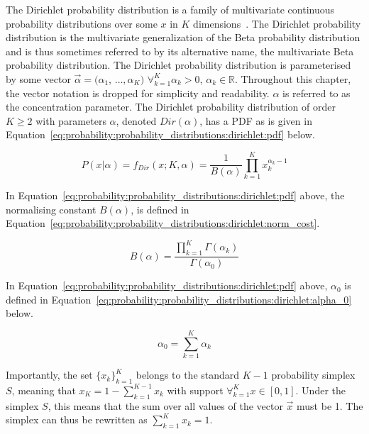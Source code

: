The Dirichlet probability distribution is a family of multivariate continuous probability distributions over some $x$ in $K$ dimensions~\cite{ref:wackerly:2014}. The Dirichlet probability distribution is the multivariate generalization of the Beta probability distribution and is thus sometimes referred to by its alternative name, the multivariate Beta probability distribution. The Dirichlet probability distribution is parameterised by some vector $\vec{\alpha} = (\alpha_{1}$,  $\dots, \alpha_{K})$ $\forall_{k=1}^{K} \alpha_{k} > 0$, $\alpha_{k} \in \mathbb{R}$. Throughout this chapter, the vector notation is dropped for simplicity and readability. $\alpha$ is referred to as the concentration parameter. The Dirichlet probability distribution of order $K \geq 2$ with parameters $\alpha$, denoted $Dir(\alpha)$, has a \acs{PDF} as is given in Equation~\eqref{eq:probability:probability_distributions:dirichlet:pdf} below.

\begin{equation}
      \label{eq:probability:probability_distributions:dirichlet:pdf}
      P(x \vert \alpha) =  f_{Dir}(x; K, \alpha) = \frac{1}{B(\alpha)}  \prod_{k=1}^{K} x_{k}^{\alpha_{k} - 1}
\end{equation}

\noindent
In Equation~\eqref{eq:probability:probability_distributions:dirichlet:pdf} above, the normalising constant $B(\alpha)$, is defined in Equation~\eqref{eq:probability:probability_distributions:dirichlet:norm_cost}.

\begin{equation}
      \label{eq:probability:probability_distributions:dirichlet:norm_cost}
      B(\alpha) = \frac{\prod_{k=1}^{K} \Gamma(\alpha_{k})}{\Gamma(\alpha_{0})}
\end{equation}

\noindent
In Equation~\eqref{eq:probability:probability_distributions:dirichlet:pdf} above, $\alpha_{0}$ is defined in Equation~\eqref{eq:probability:probability_distributions:dirichlet:alpha_0} below.

\begin{equation}
      \label{eq:probability:probability_distributions:dirichlet:alpha_0}
      \alpha_{0} = \sum_{k=1}^{K}\alpha_{k}
\end{equation}

\noindent
Importantly, the set $\{x_{k}\}_{k=1}^{K}$ belongs to the standard $K-1$ probability simplex $S$, meaning that $x_{K} = 1 - \sum_{k=1}^{K-1}x_{k}$ with support $\forall_{k=1}^{K} x \in [0,1]$. Under the simplex $S$, this means that the sum over all values of the vector $\vec{x}$ must be 1. The simplex can thus be rewritten as $\sum_{k=1}^{K}x_{k} = 1$.

